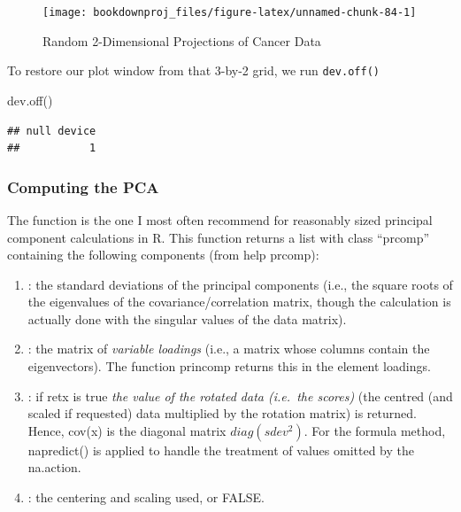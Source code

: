 \documentclass[
]{article}
\newenvironment{Shaded}{\begin{snugshade}}{\end{snugshade}}
\newcommand{\FunctionTok}[1]{\textcolor[rgb]{0.00,0.00,0.00}{#1}}
\newcommand{\NormalTok}[1]{#1}
\providecommand{\tightlist}{%
  \setlength{\itemsep}{0pt}\setlength{\parskip}{0pt}}
\theoremstyle{definition}
\theoremstyle{definition}
\theoremstyle{definition}
\theoremstyle{definition}
\theoremstyle{remark}
\begin{document}
\begin{figure}

{\centering \texttt{[image: bookdownproj\_files/figure-latex/unnamed-chunk-84-1]} 

}

\caption{Random 2-Dimensional Projections of Cancer Data}\label{fig:unnamed-chunk-84}
\end{figure}

To restore our plot window from that 3-by-2 grid, we run \texttt{dev.off()}

\begin{Shaded}
\begin{Highlighting}[]
\FunctionTok{dev.off}\NormalTok{()}
\end{Highlighting}
\end{Shaded}

\begin{verbatim}
## null device 
##           1
\end{verbatim}

\hypertarget{computing-the-pca}{%
\subsubsection{Computing the PCA}\label{computing-the-pca}}

The  function is the one I most often recommend for reasonably sized principal component calculations in R. This function returns a list with class ``prcomp'' containing the following components (from help prcomp):

\begin{enumerate}
\def\labelenumi{\arabic{enumi}.}
\tightlist
\item
  : the standard deviations of the principal components (i.e., the square roots of the eigenvalues of the covariance/correlation matrix, though the calculation is actually done with the singular values of the data matrix).
\item
  : the matrix of \emph{variable loadings} (i.e., a matrix whose columns contain the eigenvectors). The function princomp returns this in the element loadings.
\item
  : if retx is true \emph{the value of the rotated data (i.e.~the scores)} (the centred (and scaled if requested) data multiplied by the rotation matrix) is returned. Hence, cov(x) is the diagonal matrix \(diag(sdev^2)\). For the formula method, napredict() is applied to handle the treatment of values omitted by the na.action.
\item
  : the centering and scaling used, or FALSE.
\end{enumerate}
\end{document}
